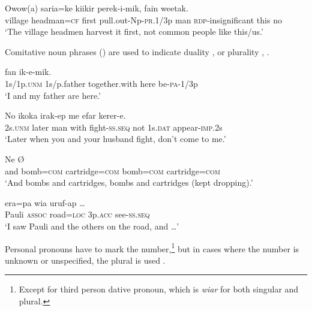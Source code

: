 \ea%
\label{ex:6:x1291}
\gll Owow(a)  saria=ke  kiikir  perek-i-mik,     fain  weetak.\\
village  headman=\textsc{cf}  first  pull.out-Np-\textsc{pr}.1/3p man  \textsc{rdp}-insignificant  this  no\\
\glt `The village headmen harvest it first, not common people like this/us.'
\z

Comitative noun phrases () are used to indicate duality ,  or plurality , . 

\ea%
\label{ex:6:x1292}
\gll {}      fan  ik-e-mik. \\
1s/1p.\textsc{unm}  1s/p.father  together.with  here  be-\textsc{pa}-1/3p\\
\glt `I and my father are here.'
\z

\ea%
\label{ex:6:x1293}
\gll No  ikoka      irak-ep  me  efar kerer-e.\\
2s.\textsc{unm}  later  man  with  fight-\textsc{ss}.\textsc{seq}  not  1s.\textsc{dat} appear-\textsc{imp}.2s\\
\glt `Later when you and your husband fight, don't come to me.'
\z

\ea%
\label{ex:6:x1294}
\gll Ne         {\O} \\
and  bomb=\textsc{com}  cartridge=\textsc{com}  bomb=\textsc{com}  cartridge=\textsc{com}\\
\glt `And bombs and cartridges, bombs and cartridges (kept dropping).'
\z

\ea%
\label{ex:6:x1295}
\gll {}    era=pa  wia  uruf-ap  {\dots} \\
Pauli  \textsc{assoc}  road=\textsc{loc}  3p.\textsc{acc}  see-\textsc{ss}.\textsc{seq}\\
\glt `I saw Pauli and the others on the road, and {\dots}'
\z

Personal pronouns have to mark the number,\footnote{Except for third person dative pronoun, which is \textit{wiar} for both singular and plural.} but in cases where the number is unknown or unspecified, the plural is used .

